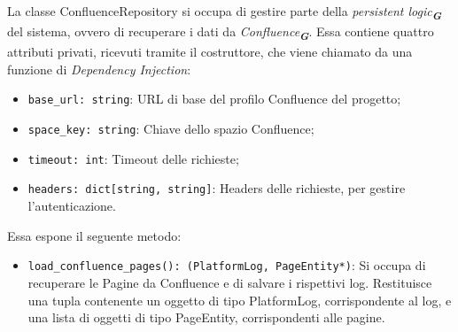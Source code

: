 \label{sec:confluence_repository}
La classe ConfluenceRepository si occupa di gestire parte della \emph{persistent logic}\textsubscript{\textbf{\textit{G}}} del sistema, ovvero di recuperare i dati da \emph{Confluence}\textsubscript{\textbf{\textit{G}}}. Essa contiene quattro attributi privati, ricevuti tramite il costruttore, che viene chiamato da una funzione di \emph{Dependency Injection}:
\begin{itemize}
    \item \texttt{base\_url: string}: URL di base del profilo Confluence del progetto;
    \item \texttt{space\_key: string}: Chiave dello spazio Confluence;
    \item \texttt{timeout: int}: Timeout delle richieste;
    \item \texttt{headers: dict[string, string]}: Headers delle richieste, per gestire l'autenticazione.
\end{itemize}
Essa espone il seguente metodo:
\begin{itemize}
    \item \texttt{load\_confluence\_pages(): (PlatformLog, PageEntity*)}: Si occupa di recuperare le Pagine da Confluence e di salvare i rispettivi log. Restituisce una tupla contenente un oggetto di tipo PlatformLog, corrispondente al log, e una lista di oggetti di tipo PageEntity, corrispondenti alle pagine.
\end{itemize}

